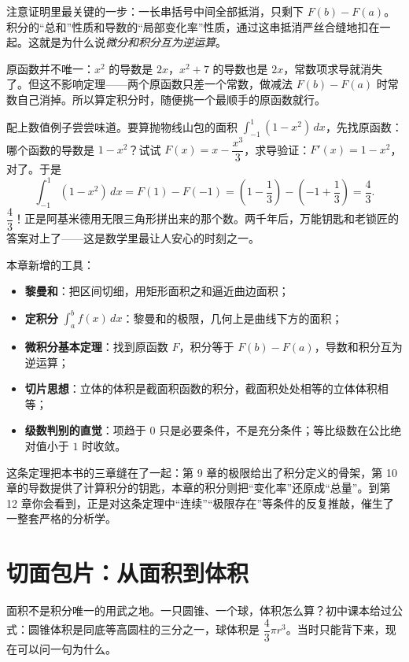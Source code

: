 注意证明里最关键的一步：一长串括号中间全部抵消，只剩下 $F(b)-F(a)$。积分的“总和”性质和导数的“局部变化率”性质，通过这串抵消严丝合缝地扣在一起。这就是为什么说\emph{微分和积分互为逆运算}。

\begin{zhu}
原函数并不唯一：$x^{2}$ 的导数是 $2x$，$x^{2}+7$ 的导数也是 $2x$，常数项求导就消失了。但这不影响定理——两个原函数只差一个常数，做减法 $F(b)-F(a)$ 时常数自己消掉。所以算定积分时，随便挑一个最顺手的原函数就行。
\end{zhu}

配上数值例子尝尝味道。要算抛物线山包的面积 $\int_{-1}^{1}(1-x^{2})\,dx$，先找原函数：哪个函数的导数是 $1-x^{2}$？试试 $F(x)=x-\dfrac{x^{3}}{3}$，求导验证：$F'(x)=1-x^{2}$，对了。于是
\[
\int_{-1}^{1}(1-x^{2})\,dx=F(1)-F(-1)=\left(1-\frac13\right)-\left(-1+\frac13\right)=\frac43 .
\]
$\dfrac43$！正是阿基米德用无限三角形拼出来的那个数。两千年后，万能钥匙和老锁匠的答案对上了——这是数学里最让人安心的时刻之一。

\begin{toolbox}
本章新增的工具：
\begin{itemize}
  \item \textbf{黎曼和}：把区间切细，用矩形面积之和逼近曲边面积；
  \item \textbf{定积分} $\int_a^b f(x)\,dx$：黎曼和的极限，几何上是曲线下方的面积；
  \item \textbf{微积分基本定理}：找到原函数 $F$，积分等于 $F(b)-F(a)$，导数和积分互为逆运算；
  \item \textbf{切片思想}：立体的体积是截面积函数的积分，截面积处处相等的立体体积相等；
  \item \textbf{级数判别的直觉}：项趋于 $0$ 只是必要条件，不是充分条件；等比级数在公比绝对值小于 $1$ 时收敛。
\end{itemize}
\end{toolbox}

\begin{lianjie}
这条定理把本书的三章缝在了一起：第 9 章的极限给出了积分定义的骨架，第 10 章的导数提供了计算积分的钥匙，本章的积分则把“变化率”还原成“总量”。到第 12 章你会看到，正是对这条定理中“连续”“极限存在”等条件的反复推敲，催生了一整套严格的分析学。
\end{lianjie}

\section{切面包片：从面积到体积}

面积不是积分唯一的用武之地。一只圆锥、一个球，体积怎么算？初中课本给过公式：圆锥体积是同底等高圆柱的三分之一，球体积是 $\dfrac{4}{3}\pi r^{3}$。当时只能背下来，现在可以问一句为什么。

